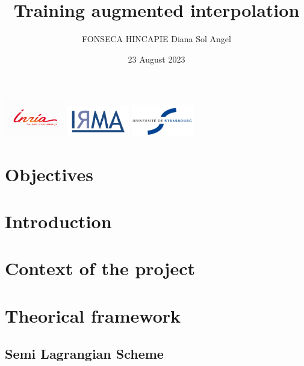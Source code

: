 \documentclass{beamer}
\begin{document}
\title[]{Training augmented interpolation}

\author[FONSECA HINCAPIE Diana Sol Angel]{FONSECA HINCAPIE Diana Sol Angel}
\date[23 August 2023]{23 August 2023}

\begin{frame}
\titlepage
\begin{center}
\includegraphics[width=0.2\textwidth]{images/inria.png}
\includegraphics[width=0.2\textwidth]{images/logo_irma.png}
\includegraphics[width=0.2\textwidth]{images/logo_unistra.jpg}

\end{center}
\end{frame}

\section{Objectives}


\section{Introduction}


\section{Context of the project}


\section{Theorical framework}
\subsection{Semi Lagrangian Scheme}
% 

\end{document}
